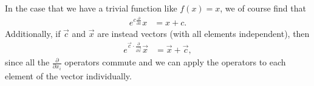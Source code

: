 In the case that we have a trivial function like $f(x) = x$, we of course find that
\begin{align}
	e^{c \frac{\partial}{\partial x}} x
	&= x + c.
\end{align}
Additionally, if $\vec{c}$ and $\vec{x}$ are instead vectors (with all elements independent), then
\begin{align}
	e^{\vec{c} \cdot \frac{\partial}{\partial \vec{x}}} \vec{x}
	&= \vec{x} + \vec{c},
		\label{eq:exp-deriv}
\end{align}
since all the $\frac{\partial}{\partial x_i}$ operators commute and we can apply the operators to each element of the vector individually.
